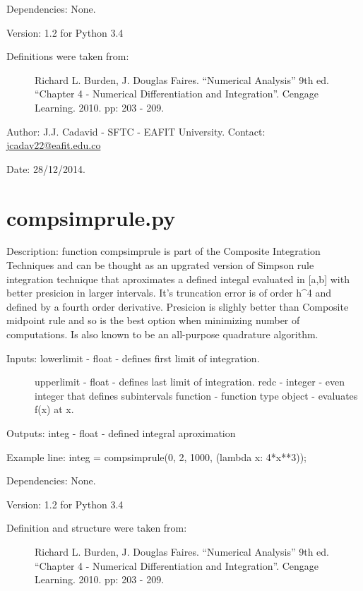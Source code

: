 \documentclass[letterpaper,10pt,oneside]{sphinxmanual}
\theoremstyle{plain}%
\theoremstyle{definition}%
\theoremstyle{remark}%
\begin{document}
Dependencies: None.

Version: 1.2 for Python 3.4
\begin{description}
\item[{Definitions were taken from:}] \leavevmode
Richard L. Burden, J. Douglas Faires. ``Numerical Analysis'' 9th ed.
``Chapter 4 - Numerical Differentiation and Integration''. 
Cengage Learning. 2010. pp: 203 - 209.

\end{description}

Author: J.J. Cadavid - SFTC - EAFIT University.
Contact: \href{mailto:jcadav22@eafit.edu.co}{jcadav22@eafit.edu.co}

Date: 28/12/2014.


\section{compsimprule.py}
\label{code:compsimprule-py}\label{code:module-compsimprule}
Description: function compsimprule is part of the Composite Integration
Techniques and can be thought as an upgrated version of Simpson rule
integration technique that aproximates a defined integal evaluated in {[}a,b{]}
with better presicion in larger intervals. It's truncation error is of order
h\textasciicircum{}4 and defined by a fourth order derivative. Presicion is slighly better
than Composite midpoint rule and so is the best option when minimizing
number of computations. Is also known to be an all-purpose quadrature algorithm.
\begin{description}
\item[{Inputs: lowerlimit - float - defines first limit of integration.}] \leavevmode
upperlimit - float - defines last limit of integration.
redc - integer - even integer that defines subintervals
function - function type object - evaluates f(x) at x.

\end{description}

Outputs: integ - float - defined integral aproximation

Example line: integ = compsimprule(0, 2, 1000, (lambda x: 4*x**3));

Dependencies: None.

Version: 1.2 for Python 3.4
\begin{description}
\item[{Definition and structure were taken from:}] \leavevmode
Richard L. Burden, J. Douglas Faires. ``Numerical Analysis'' 9th ed.
``Chapter 4 - Numerical Differentiation and Integration''. 
Cengage Learning. 2010. pp: 203 - 209.

\end{description}
\end{document}
